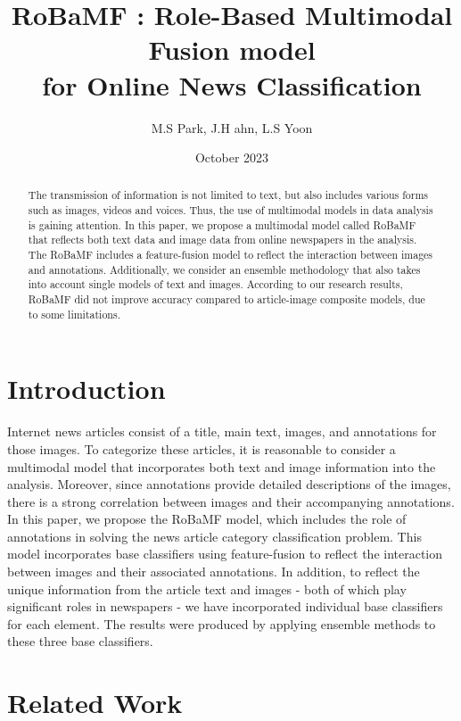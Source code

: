 \documentclass{article}
\title{RoBaMF : Role-Based Multimodal Fusion model\\
for Online News Classification}
\author{M.S Park, J.H ahn, L.S Yoon}
\date{October 2023}
\begin{document}
\maketitle

\begin{abstract}
  The transmission of information is not limited to text, but also includes various forms such as images, videos and voices. Thus, the use of multimodal models in data analysis is gaining attention. In this paper, we propose a multimodal model called RoBaMF that reflects both text data and image data from online newspapers in the analysis. The RoBaMF includes a feature-fusion model to reflect the interaction between images and annotations. Additionally, we consider an ensemble methodology that also takes into account single models of text and images. According to our research results, RoBaMF did not improve accuracy compared to article-image composite models, due to some limitations.
\end{abstract}

\section{Introduction}
Internet news articles consist of a title, main text, images, and annotations for those images. To categorize these articles, it is reasonable to consider a multimodal model that incorporates both text and image information into the analysis. Moreover, since annotations provide detailed descriptions of the images, there is a strong correlation between images and their accompanying annotations. In this paper, we propose the RoBaMF model, which includes the role of annotations in solving the news article category classification problem. This model incorporates base classifiers using feature-fusion to reflect the interaction between images and their associated annotations. In addition, to reflect the unique information from the article text and images - both of which play significant roles in newspapers - we have incorporated individual base classifiers for each element. The results were produced by applying ensemble methods to these three base classifiers.



\section{Related Work}
\end{document}
